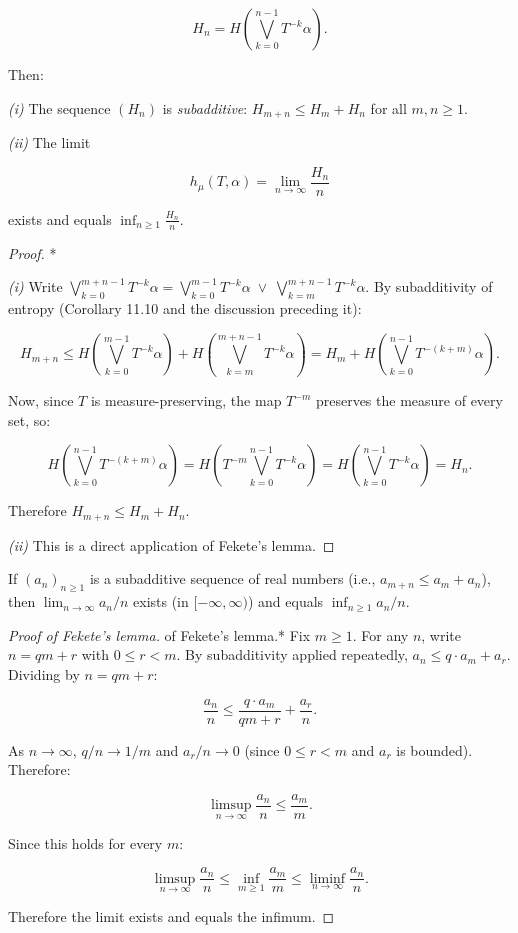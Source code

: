 \[
H_n = H\!\left(\bigvee_{k=0}^{n-1} T^{-k}\alpha\right).
\]

Then:

\textit{(i)} The sequence $(H_n)$ is \textit{subadditive}: $H_{m+n} \leq H_m + H_n$ for all $m, n \geq 1$.

\textit{(ii)} The limit

\[
h_\mu(T, \alpha) = \lim_{n \to \infty} \frac{H_n}{n}
\]

exists and equals $\inf_{n \geq 1} \frac{H_n}{n}$.

\begin{proof}
*

\textit{(i)} Write $\bigvee_{k=0}^{m+n-1} T^{-k}\alpha = \bigvee_{k=0}^{m-1} T^{-k}\alpha \;\vee\; \bigvee_{k=m}^{m+n-1} T^{-k}\alpha$. By subadditivity of entropy (Corollary 11.10 and the discussion preceding it):

\[
H_{m+n} \leq H\!\left(\bigvee_{k=0}^{m-1} T^{-k}\alpha\right) + H\!\left(\bigvee_{k=m}^{m+n-1} T^{-k}\alpha\right) = H_m + H\!\left(\bigvee_{k=0}^{n-1} T^{-(k+m)}\alpha\right).
\]

Now, since $T$ is measure-preserving, the map $T^{-m}$ preserves the measure of every set, so:

\[
H\!\left(\bigvee_{k=0}^{n-1} T^{-(k+m)}\alpha\right) = H\!\left(T^{-m}\bigvee_{k=0}^{n-1} T^{-k}\alpha\right) = H\!\left(\bigvee_{k=0}^{n-1} T^{-k}\alpha\right) = H_n.
\]

Therefore $H_{m+n} \leq H_m + H_n$.

\textit{(ii)} This is a direct application of Fekete's lemma.

\end{proof}

\begin{lemma}[Fekete]\label{lem:11.13}
If $(a_n)_{n \geq 1}$ is a subadditive sequence of real numbers (i.e., $a_{m+n} \leq a_m + a_n$), then $\lim_{n \to \infty} a_n / n$ exists (in $[-\infty, \infty)$) and equals $\inf_{n \geq 1} a_n/n$.
\end{lemma}


\begin{proof}[Proof of Fekete's lemma]
of Fekete's lemma.* Fix $m \geq 1$. For any $n$, write $n = qm + r$ with $0 \leq r < m$. By subadditivity applied repeatedly, $a_n \leq q \cdot a_m + a_r$. Dividing by $n = qm + r$:

\[
\frac{a_n}{n} \leq \frac{q \cdot a_m}{qm + r} + \frac{a_r}{n}.
\]

As $n \to \infty$, $q/n \to 1/m$ and $a_r/n \to 0$ (since $0 \leq r < m$ and $a_r$ is bounded). Therefore:

\[
\limsup_{n \to \infty} \frac{a_n}{n} \leq \frac{a_m}{m}.
\]

Since this holds for every $m$:

\[
\limsup_{n \to \infty} \frac{a_n}{n} \leq \inf_{m \geq 1} \frac{a_m}{m} \leq \liminf_{n \to \infty} \frac{a_n}{n}.
\]

Therefore the limit exists and equals the infimum.
\end{proof}


